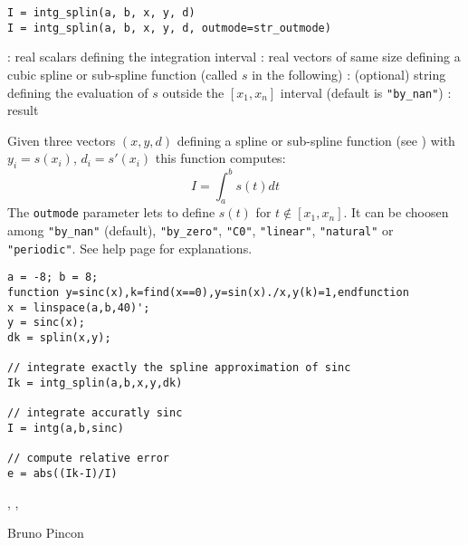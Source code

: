 
\begin{mandesc}
\end{mandesc}

\begin{calling_sequence}
    \begin{verbatim}
I = intg_splin(a, b, x, y, d)
I = intg_splin(a, b, x, y, d, outmode=str_outmode)
    \end{verbatim}
\end{calling_sequence}

\begin{parameters}
  \begin{varlist}
   : real scalars defining the integration interval
   : real vectors of same size defining a cubic spline or sub-spline function 
                (called $s$ in the following)
                : (optional) string defining the evaluation of $s$ outside the $[x_1,x_n]$ interval
                (default is \verb+"by_nan"+)
   : result
  \end{varlist}
\end{parameters}

\begin{mandescription}
    Given three vectors $(x,y,d)$ defining a spline or sub-spline function
    (see  ) with $y_i=s(x_i)$, $d_i = s'(x_i)$ this function
    computes:
$$
    I = \int_a^b s(t) dt
$$
    The \verb!outmode! parameter lets to define $s(t)$ for $t \notin [x_1,x_n]$.
 It can be choosen among \verb+"by_nan"+ (default),  \verb+"by_zero"+,  \verb+"C0"+,
    \verb+"linear"+,  \verb+"natural"+ or  \verb+"periodic"+. See 
 help page for explanations.

  \end{mandescription}

  \begin{examples}

\begin{Verbatim}
a = -8; b = 8;
function y=sinc(x),k=find(x==0),y=sin(x)./x,y(k)=1,endfunction
x = linspace(a,b,40)';
y = sinc(x);
dk = splin(x,y);

// integrate exactly the spline approximation of sinc
Ik = intg_splin(a,b,x,y,dk)

// integrate accuratly sinc 
I = intg(a,b,sinc)

// compute relative error
e = abs((Ik-I)/I)
\end{Verbatim}

\end{examples}

\begin{manseealso}
, , 
\end{manseealso}

\begin{authors}
    Bruno Pincon
\end{authors}

